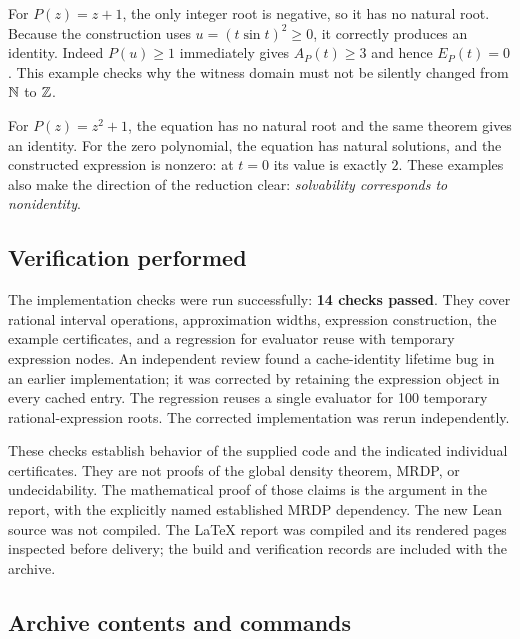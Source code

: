 For $P(z)=z+1$, the only integer root is negative, so it has no natural
root. Because the construction uses $u=(t\sin t)^2\ge0$, it correctly
produces an identity. Indeed $P(u)\ge1$ immediately gives $A_P(t)\ge3$
and hence $E_P(t)=0$. This example checks why the witness domain must not
be silently changed from $\mathbb N$ to $\mathbb Z$.

For $P(z)=z^2+1$, the equation has no natural root and the same theorem
gives an identity. For the zero polynomial, the equation has natural
solutions, and the constructed expression is nonzero: at $t=0$ its value
is exactly $2$. These examples also make the direction of the reduction
clear: \emph{solvability corresponds to nonidentity}.

\subsection{Verification performed}

The implementation checks were run successfully: \textbf{14 checks passed}.
They cover rational interval operations, approximation widths, expression
construction, the example certificates, and a regression for evaluator
reuse with temporary expression nodes. An independent review found a
cache-identity lifetime bug in an earlier implementation; it was corrected
by retaining the expression object in every cached entry. The regression
reuses a single evaluator for 100 temporary rational-expression roots.
The corrected implementation was rerun independently.

These checks establish behavior of the supplied code and the indicated
individual certificates. They are not proofs of the global density
theorem, MRDP, or undecidability. The mathematical proof of those claims
is the argument in the report, with the explicitly named established
MRDP dependency. The new Lean source was not compiled. The LaTeX report
was compiled and its rendered pages inspected before delivery; the
build and verification records are included with the archive.

\subsection{Archive contents and commands}

